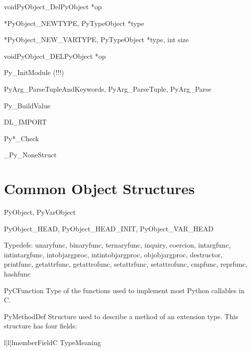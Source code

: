 \documentclass{manual}
\begin{document}
\begin{cfuncdesc}{void}{PyObject_Del}{PyObject *op}
\end{cfuncdesc}

\begin{cfuncdesc}{*}{PyObject_NEW}{TYPE, PyTypeObject *type}
\end{cfuncdesc}

\begin{cfuncdesc}{*}{PyObject_NEW_VAR}{TYPE, PyTypeObject *type,
                                                int size}
\end{cfuncdesc}

\begin{cfuncdesc}{void}{PyObject_DEL}{PyObject *op}
\end{cfuncdesc}

Py_InitModule (!!!)

PyArg_ParseTupleAndKeywords, PyArg_ParseTuple, PyArg_Parse

Py_BuildValue

DL_IMPORT

Py*_Check

_Py_NoneStruct


\section{Common Object Structures \label{common-structs}}

PyObject, PyVarObject

PyObject_HEAD, PyObject_HEAD_INIT, PyObject_VAR_HEAD

Typedefs:
unaryfunc, binaryfunc, ternaryfunc, inquiry, coercion, intargfunc,
intintargfunc, intobjargproc, intintobjargproc, objobjargproc,
destructor, printfunc, getattrfunc, getattrofunc, setattrfunc,
setattrofunc, cmpfunc, reprfunc, hashfunc

\begin{ctypedesc}{PyCFunction}
Type of the functions used to implement most Python callables in C.
\end{ctypedesc}

\begin{ctypedesc}{PyMethodDef}
Structure used to describe a method of an extension type.  This
structure has four fields:

\begin{tableiii}{l|l|l}{member}{Field}{C Type}{Meaning}
\end{tableiii}
\end{ctypedesc}
\end{document}
